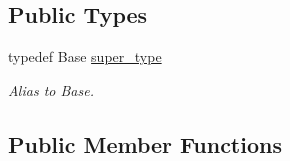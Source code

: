\subsection*{Public Types}
\begin{DoxyCompactItemize}
\item 
typedef Base \hyperlink{structyy_1_1genesyspp__parser_1_1basic__symbol_a1493afba8ed8b978a445fa2cb8b57867}{super\-\_\-type}
\begin{DoxyCompactList}\small\item\em Alias to Base. \end{DoxyCompactList}\end{DoxyCompactItemize}
\subsection*{Public Member Functions}
